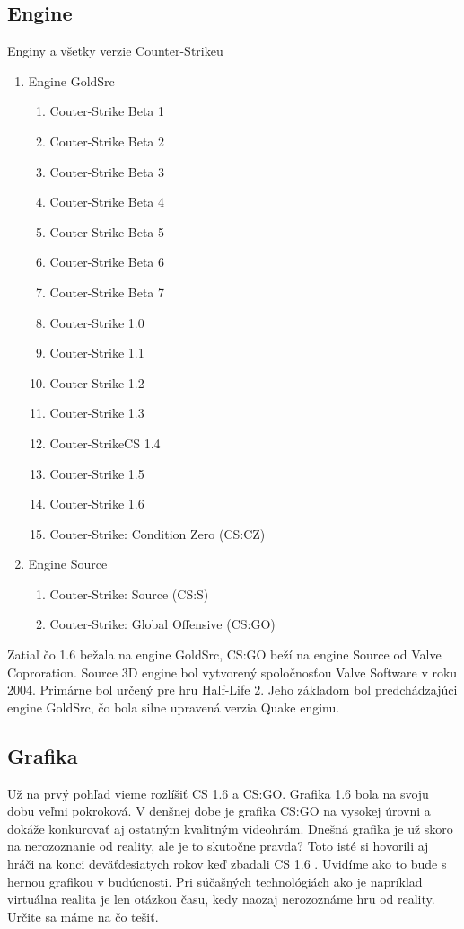 \documentclass[10pt,twoside,slovak,a4paper]{article}
\begin{document}
\subsection{Engine} \label{porovnanie:engine}

Enginy a všetky verzie Counter-Strikeu
\begin{enumerate}
\item Engine GoldSrc
	\begin{enumerate}
	\item Couter-Strike Beta 1
	\item Couter-Strike Beta 2
	\item Couter-Strike Beta 3
	\item Couter-Strike Beta 4
	\item Couter-Strike Beta 5
	\item Couter-Strike Beta 6
	\item Couter-Strike Beta 7
	\item Couter-Strike 1.0
	\item Couter-Strike 1.1
	\item Couter-Strike 1.2
	\item Couter-Strike 1.3
	\item Couter-StrikeCS 1.4
	\item Couter-Strike 1.5
	\item Couter-Strike 1.6
	\item Couter-Strike: Condition Zero (CS:CZ)
	\end{enumerate}
\item Engine Source
	\begin{enumerate}
	\item Couter-Strike: Source (CS:S)
	\item Couter-Strike: Global Offensive (CS:GO)
	\end{enumerate}
\end{enumerate}

Zatiaľ čo 1.6 bežala na engine GoldSrc, CS:GO beží na engine Source od Valve Coproration. Source 3D engine bol vytvorený spoločnosťou Valve Software v roku 2004. Primárne bol určený pre hru Half-Life 2. Jeho základom bol predchádzajúci engine GoldSrc, čo bola silne upravená verzia Quake enginu.

\subsection{Grafika} \label{porovnanie:grafika}

Už na prvý pohľad vieme rozlíšiť CS 1.6 a CS:GO. Grafika 1.6 bola na svoju dobu veľmi pokroková. V denšnej dobe je grafika  CS:GO na vysokej úrovni a dokáže konkurovať aj ostatným kvalitným videohrám. Dnešná grafika je už skoro na nerozoznanie od reality, ale je to skutočne pravda? Toto isté si hovorili aj hráči na konci deväťdesiatych rokov keď zbadali CS 1.6 . Uvidíme ako to bude s hernou grafikou v budúcnosti. Pri súčašných technológiách ako je napríklad virtuálna realita je len otázkou času, kedy naozaj nerozoznáme hru od reality. Určite sa máme na čo tešiť.
\end{document}
